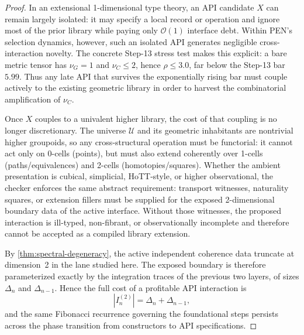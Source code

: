 \documentclass[11pt,a4paper]{article}
\theoremstyle{plain}
\theoremstyle{definition}
\theoremstyle{remark}
\newcommand{\U}{\mathcal{U}}
\begin{document}
\begin{proof}
In an extensional 1-dimensional type theory, an API candidate $X$ can remain largely isolated: it may specify a local record or operation and ignore most of the prior library while paying only $\mathcal{O}(1)$ interface debt.
Within PEN's selection dynamics, however, such an isolated API generates negligible cross-interaction novelty.
The concrete Step-13 stress test makes this explicit: a bare metric tensor has $\nu_G = 1$ and $\nu_C \le 2$, hence $\rho \le 3.0$, far below the Step-13 bar $5.99$.
Thus any late API that survives the exponentially rising bar must couple actively to the existing geometric library in order to harvest the combinatorial amplification of $\nu_C$.

Once $X$ couples to a univalent higher library, the cost of that coupling is no longer discretionary.
The universe $\U$ and its geometric inhabitants are nontrivial higher groupoids, so any cross-structural operation must be functorial: it cannot act only on 0-cells (points), but must also extend coherently over 1-cells (paths/equivalences) and 2-cells (homotopies/squares).
Whether the ambient presentation is cubical, simplicial, HoTT-style, or higher observational, the checker enforces the same abstract requirement: transport witnesses, naturality squares, or extension fillers must be supplied for the exposed 2-dimensional boundary data of the active interface.
Without those witnesses, the proposed interaction is ill-typed, non-fibrant, or observationally incomplete and therefore cannot be accepted as a compiled library extension.

By \cref{thm:spectral-degeneracy}, the active independent coherence data truncate at dimension~2 in the lane studied here.
The exposed boundary is therefore parameterized exactly by the integration traces of the previous two layers, of sizes $\Delta_n$ and $\Delta_{n-1}$.
Hence the full cost of a profitable API interaction is
\[
  |I_n^{(2)}| = \Delta_n + \Delta_{n-1},
\]
and the same Fibonacci recurrence governing the foundational steps persists across the phase transition from constructors to API specifications.
\end{proof}
\end{document}
